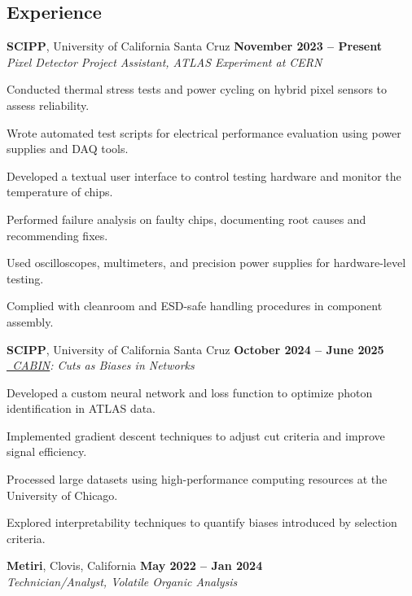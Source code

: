 \documentclass[margin,line]{resume}
\let\origsection\section%
\let\section\subsection%
\let\section\origsection%
\begin{document}
\begin{resume}
\section{\mysidestyle Experience}

\textbf{SCIPP}, University of California Santa Cruz \hfill \textbf{November 2023 -- Present}\\
\textsl{Pixel Detector Project Assistant, ATLAS Experiment at CERN}
\begin{list2}
\item Conducted thermal stress tests and power cycling on hybrid pixel sensors to assess reliability.
\item Wrote automated test scripts for electrical performance evaluation using power supplies and DAQ tools.
\item Developed a textual user interface to control testing hardware and monitor the temperature of chips. 
\item Performed failure analysis on faulty chips, documenting root causes and recommending fixes.
\item Used oscilloscopes, multimeters, and precision power supplies for hardware-level testing.
\item Complied with cleanroom and ESD-safe handling procedures in component assembly.
\end{list2}
\textbf{SCIPP}, University of California Santa Cruz \hfill \textbf{October 2024 -- June 2025}\\
\textsl{\href{https://github.com/scipp-atlas/CABIN}{~CABIN}: Cuts as Biases in Networks}
\begin{list2}
  \item Developed a custom neural network and loss function to optimize photon identification in ATLAS data.
  \item Implemented gradient descent techniques to adjust cut criteria and improve signal efficiency.
  \item Processed large datasets using high-performance computing resources at the University of Chicago.
  \item Explored interpretability techniques to quantify biases introduced by selection criteria.
\end{list2}
{{\textbf{Metiri}}}, Clovis, California \hfill \textbf{May 2022 -- Jan 2024}\\
\textsl{Technician/Analyst, Volatile Organic Analysis}

\end{resume}
\end{document}
